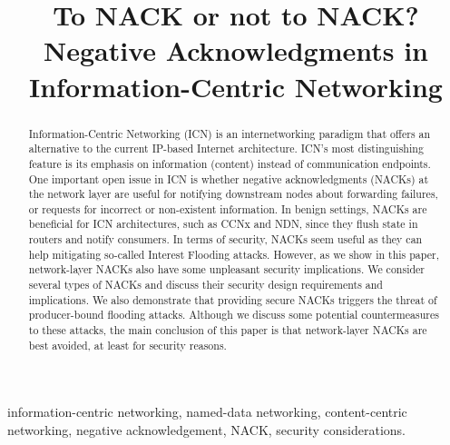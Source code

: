 \documentclass[conference]{IEEEtran}
\begin{document}
\title{To NACK or not to NACK? \\{\huge Negative Acknowledgments in Information-Centric Networking}}
\author{
\and
{}
\and
{}
\and
{}
}



\maketitle

\begin{abstract}
Information-Centric Networking (ICN) is an internetworking paradigm
that offers an alternative to the current IP\nobreakdash-based Internet architecture.
ICN's most distinguishing feature is its emphasis on information (content) 
instead of communication endpoints. One important open issue in ICN is
whether negative acknowledgments (NACKs) at the network layer are useful
for notifying downstream nodes about forwarding failures, or requests for
incorrect or non-existent information. In benign settings, NACKs are beneficial for 
ICN architectures, such as CCNx and NDN, since they flush state in routers and
notify consumers. In terms of security, NACKs seem useful as they can help
mitigating so-called Interest Flooding attacks. However,
as we show in this paper, network-layer NACKs also have some
unpleasant security implications. We consider several types of NACKs and
discuss their security design requirements and implications. We also demonstrate
that providing secure NACKs triggers the threat of producer-bound flooding
attacks. Although we discuss some potential countermeasures to these attacks,
the main conclusion of this paper is that network-layer NACKs are best avoided,
at least for security reasons.
\end{abstract}

\begin{IEEEkeywords}
information-centric networking, named-data networking, content-centric networking, 
negative acknowledgement, NACK, security considerations.
\end{IEEEkeywords}
\end{document}
